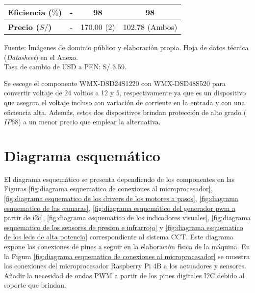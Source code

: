 \begin{savenotes}
\begin{mytable}[H]
\begin{tabular}{l|c|c|c|}
{\begin{minipage}{\myforthmaxsizeofcontenttable}
					\textbf{Eficiencia ($\%$)}
				\end{minipage}
			} & - & 98 & 98 \\ \hline
			\multicolumn{1}{|l|}{
				\begin{minipage}{\myforthmaxsizeofcontenttable}	
					\textbf{Precio ($S/$)}
				\end{minipage}
			} & - & 170.00 (2) & 102.78 (Ambos)  \\ \hline		
		\end{tabular}
		\begin{myflushcenteraftertable}	
			Fuente: Imágenes de dominio público y elaboración propia. Hoja de datos técnica (\textit{Datasheet}) en el Anexo.\\
			Tasa de cambio de USD a PEN: S/ 3.59.
		\end{myflushcenteraftertable}
	\end{mytable}
\end{savenotes}

Se escoge el componente WMX-DSD24S1220 con WMX-DSD48S520 para convertir voltaje de 24 voltios a 12 y 5, respectivamente ya que es un dispositivo que asegura el voltaje incluso con variación de corriente en la entrada y con una eficiencia alta. Además, estos dos dispositivos brindan protección de alto grado ($IP68$) a un menor precio que emplear la alternativa.


\section{Diagrama esquemático} 

El diagrama esquemático se presenta dependiendo de los componentes en las Figuras \ref{fig:diagrama esquematico de conexiones al microprocesador}, \ref{fig:diagrama esquematico de los drivers de los motores a pasos}, \ref{fig:diagrama esquematico de las camaras}, \ref{fig:diagrama esquemático del generador pwm a partir de i2c}, \ref{fig:diagrama esquematico de los indicadores visuales}, \ref{fig:diagrama esquematico de los sensores de presion e infrarrojo} y \ref{fig:diagrama esquematico de los leds de alta potencia} correspondiente al sistema CCT. Este diagrama expone las conexiones de pines a seguir en la elaboración física de la máquina. En la Figura \ref{fig:diagrama esquematico de conexiones al microprocesador} se muestra las conexiones del microprocesador Raspberry Pi 4B a los actuadores y sensores. Añadir la necesidad de ondas PWM a partir de los pines digitales I2C debido al soporte que brindan.

